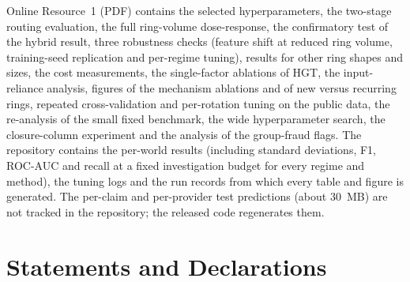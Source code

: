 \documentclass[pdflatex,sn-vancouver-num]{sn-jnl}
\begin{document}
\backmatter

Online Resource~1 (PDF) contains the selected hyperparameters, the
two-stage routing evaluation, the full ring-volume dose-response, the
confirmatory test of the hybrid result, three robustness checks (feature
shift at reduced ring volume, training-seed replication and per-regime
tuning), results for other ring shapes and sizes, the cost measurements, the
single-factor ablations of HGT, the input-reliance analysis, figures of the
mechanism ablations and of new versus recurring rings, repeated
cross-validation and per-rotation tuning on the public data, the
re-analysis of the small fixed benchmark, the wide hyperparameter search, the
closure-column experiment and the analysis of the group-fraud flags.
The repository contains the per-world results (including standard
deviations, F1, ROC-AUC and recall at a fixed investigation budget for every
regime and method), the tuning logs and the run records from which every
table and figure is generated. The per-claim and per-provider test
predictions (about 30~MB) are not tracked in the repository; the released
code regenerates them.

\section*{Statements and Declarations}
\end{document}

